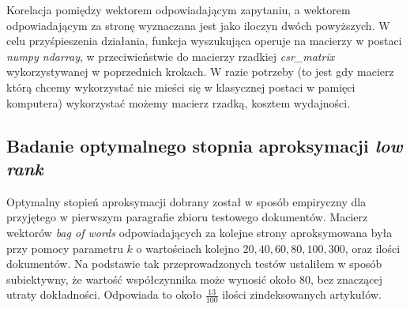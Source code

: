 \documentclass{article}
\begin{document}
        Korelacja pomiędzy wektorem odpowiadającym zapytaniu, a wektorem odpowiadającym za stronę wyznaczana jest jako iloczyn dwóch powyższych. W celu przyśpieszenia działania, funkcja wyszukująca operuje na macierzy w postaci \textit{numpy ndarray}, w przeciwieństwie do macierzy rzadkiej \textit{csr\_matrix} wykorzystywanej w poprzednich krokach. W razie potrzeby (to jest gdy macierz którą chcemy wykorzystać nie mieści się w klasycznej postaci w pamięci komputera) wykorzystać możemy macierz rzadką, kosztem wydajności. 
        
        \subsection{Badanie optymalnego stopnia aproksymacji \textit{low rank}}
        Optymalny stopień aproksymacji dobrany został w sposób empiryczny dla przyjętego w pierwszym paragrafie zbioru testowego dokumentów. Macierz wektorów \textit{bag of words} odpowiadających za kolejne strony aproksymowana była przy pomocy parametru $k$ o wartościach kolejno ${20,40,60,80,100,300}$, oraz ilości dokumentów. Na podstawie tak przeprowadzonych testów ustaliłem w sposób subiektywny, że wartość współczynnika może wynosić około $80$, bez znaczącej utraty dokładności. Odpowiada to około $\frac{13}{100}$ ilości zindeksowanych artykułów. 
\end{document}
